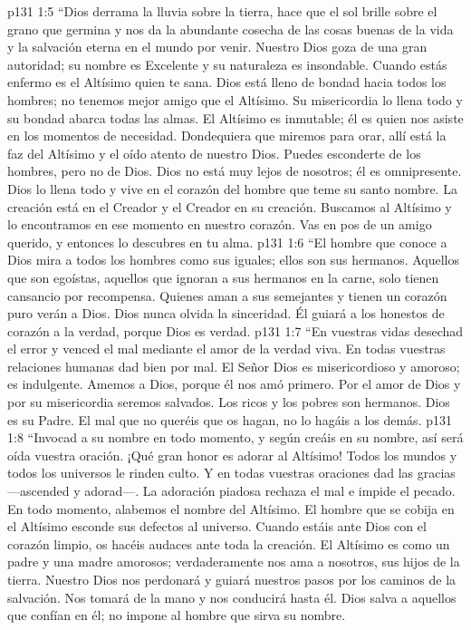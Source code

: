 \vs p131 1:5 “Dios derrama la lluvia sobre la tierra, hace que el sol brille sobre el grano que germina y nos da la abundante cosecha de las cosas buenas de la vida y la salvación eterna en el mundo por venir. Nuestro Dios goza de una gran autoridad; su nombre es Excelente y su naturaleza es insondable. Cuando estás enfermo es el Altísimo quien te sana. Dios está lleno de bondad hacia todos los hombres; no tenemos mejor amigo que el Altísimo. Su misericordia lo llena todo y su bondad abarca todas las almas. El Altísimo es inmutable; él es quien nos asiste en los momentos de necesidad. Dondequiera que miremos para orar, allí está la faz del Altísimo y el oído atento de nuestro Dios. Puedes esconderte de los hombres, pero no de Dios. Dios no está muy lejos de nosotros; él es omnipresente. Dios lo llena todo y vive en el corazón del hombre que teme su santo nombre. La creación está en el Creador y el Creador en su creación. Buscamos al Altísimo y lo encontramos en ese momento en nuestro corazón. Vas en pos de un amigo querido, y entonces lo descubres en tu alma.
\vs p131 1:6 “El hombre que conoce a Dios mira a todos los hombres como sus iguales; ellos son sus hermanos. Aquellos que son egoístas, aquellos que ignoran a sus hermanos en la carne, solo tienen cansancio por recompensa. Quienes aman a sus semejantes y tienen un corazón puro verán a Dios. Dios nunca olvida la sinceridad. Él guiará a los honestos de corazón a la verdad, porque Dios es verdad.
\vs p131 1:7 “En vuestras vidas desechad el error y venced el mal mediante el amor de la verdad viva. En todas vuestras relaciones humanas dad bien por mal. El Señor Dios es misericordioso y amoroso; es indulgente. Amemos a Dios, porque él nos amó primero. Por el amor de Dios y por su misericordia seremos salvados. Los ricos y los pobres son hermanos. Dios es su Padre. El mal que no queréis que os hagan, no lo hagáis a los demás.
\vs p131 1:8 “Invocad a su nombre en todo momento, y según creáis en su nombre, así será oída vuestra oración. ¡Qué gran honor es adorar al Altísimo! Todos los mundos y todos los universos le rinden culto. Y en todas vuestras oraciones dad las gracias ---ascended y adorad---. La adoración piadosa rechaza el mal e impide el pecado. En todo momento, alabemos el nombre del Altísimo. El hombre que se cobija en el Altísimo esconde sus defectos al universo. Cuando estáis ante Dios con el corazón limpio, os hacéis audaces ante toda la creación. El Altísimo es como un padre y una madre amorosos; verdaderamente nos ama a nosotros, sus hijos de la tierra. Nuestro Dios nos perdonará y guiará nuestros pasos por los caminos de la salvación. Nos tomará de la mano y nos conducirá hasta él. Dios salva a aquellos que confían en él; no impone al hombre que sirva su nombre.
